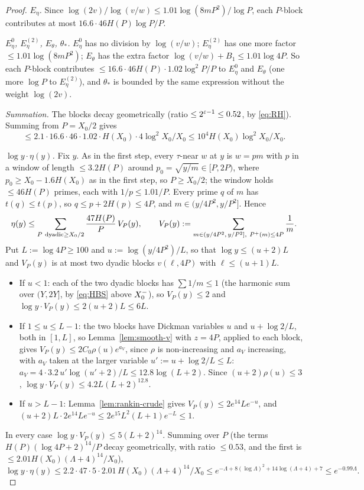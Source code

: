 \begin{proof}
\emph{$E_\eta$.} Since $\log(2v)/\log(v/w)\le1.01\log(8mP^2)/\log P$, each $P$-block contributes at most
$16.6\cdot46H(P)\log P/P$.

\emph{$E_\eta^0$, $E_\eta^{(2)}$, $E_\theta$, $\theta_*$.} $E_\eta^0$ has no division by $\log(v/w)$; $E_\eta^{(2)}$ has one
more factor $\le1.01\log(8mP^2)$; $E_\theta$ has the extra factor $\log(v/w)+B_1\le1.01\log4P$. So each $P$-block contributes
$\le16.6\cdot46H(P)\cdot1.02\log^2P/P$ to $E_\eta^0$ and $E_\theta$ (one more $\log P$ to $E_\eta^{(2)}$),
and $\theta_*$ is bounded by the same expression without the weight $\log(2v)$.

\emph{Summation.} The blocks decay geometrically (ratio $\le2^{\varepsilon-1}\le0.52$, by \eqref{eq:RH}). Summing from
$P=X_0/2$ gives
\[
  \le2.1\cdot16.6\cdot46\cdot1.02\cdot H(X_0)\cdot4\log^2X_0/X_0\le10^4H(X_0)\log^2X_0/X_0.
\]

\emph{$\log y\cdot\eta(y)$.} Fix $y$. As in the first step, every $\tau$-near $w$ at $y$ is $w=pm$ with $p$ in a window of
length $\le3.2H(P)$ around $p_0=\sqrt{y/m}\in[P,2P)$, where $p_0\ge X_0-1.6H(X_0)$ as in the first step, so $P\ge X_0/2$; the window
holds $\le46H(P)$ primes, each with
$1/p\le1.01/P$. Every prime $q$ of $m$ has $t(q)\le t(p)$, so $q\le p+2H(p)\le4P$, and $m\in(y/4P^2,y/P^2]$. Hence
\[
  \eta(y)\le\sum_{P\ \text{dyadic}\ge X_0/2}\frac{47H(P)}P\,V_P(y),\qquad
  V_P(y):=\sum_{m\in(y/4P^2,\,y/P^2],\ P^{+}(m)\le4P}\frac1m .
\]
Put $L:=\log4P\ge100$ and $u:=\log(y/4P^2)/L$, so that $\log y\le(u+2)L$ and $V_P(y)$ is at most two dyadic blocks
$v(\ell,4P)$ with $\ell\le(u+1)L$.
\begin{itemize}
\item If $u<1$: each of the two dyadic blocks has $\sum1/m\le1$ (the harmonic sum over $(Y,2Y]$, by \eqref{eq:HBS} above
  $X_0^{-}$), so $V_P(y)\le2$ and $\log y\cdot V_P(y)\le2(u+2)L\le6L$.
\item If $1\le u\le L-1$: the two blocks have Dickman variables $u$ and $u+\log2/L$, both in $[1,L]$, so Lemma~\ref{lem:smooth-v}
  with $z=4P$, applied to each block, gives $V_P(y)\le2C_0\rho(u)e^{a_V}$, since $\rho$ is non-increasing and $a_V$ increasing, with $a_V$
  taken at the larger variable $u':=u+\log2/L\le L$: $a_V=4\cdot3.2\,u'\log(u'+2)/L\le12.8\log(L+2)$. Since $(u+2)\rho(u)\le3$,
  $\log y\cdot V_P(y)\le4.2L(L+2)^{12.8}$.
\item If $u>L-1$: Lemma~\ref{lem:rankin-crude} gives $V_P(y)\le2e^{14}Le^{-u}$, and
  $(u+2)L\cdot2e^{14}Le^{-u}\le2e^{15}L^2(L+1)e^{-L}\le1$.
\end{itemize}
In every case $\log y\cdot V_P(y)\le5(L+2)^{14}$. Summing over $P$ (the terms $H(P)(\log4P+2)^{14}/P$ decay geometrically, with
ratio $\le0.53$, and the first is $\le2.01H(X_0)(\Lambda+4)^{14}/X_0$),
\[
  \log y\cdot\eta(y)\le2.2\cdot47\cdot5\cdot2.01\,H(X_0)(\Lambda+4)^{14}/X_0\le e^{-\Lambda+8(\log\Lambda)^2+14\log(\Lambda+4)+7}\le e^{-0.99\Lambda}.
\]


\end{proof}
